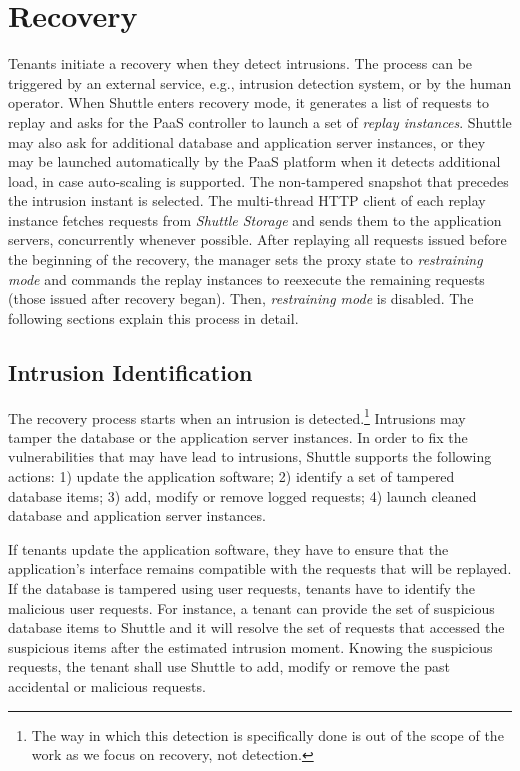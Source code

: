 \section{Recovery}
\label{sec:recovery}

Tenants initiate a recovery when they detect intrusions. The process can be triggered by an external service, e.g., intrusion detection system, or by the human operator. When Shuttle enters recovery mode, it generates a list of requests to replay and asks for the \ac{PaaS} controller to launch a set of \textit{replay instances}. Shuttle may also ask for additional database and application server instances, or they may be launched automatically by the \ac{PaaS} platform when it detects additional load, in case auto-scaling is supported. The non-tampered snapshot that precedes the intrusion instant is selected. The multi-thread HTTP client of each replay instance fetches requests from \emph{Shuttle Storage} and sends them to the application servers, concurrently whenever possible. After replaying all requests issued before the beginning of the recovery, the manager sets the proxy state to \emph{restraining mode} and commands the replay instances to reexecute the remaining requests (those issued after recovery began). Then, \emph{restraining mode} is disabled. 
The following sections explain this process in detail.


\subsection{Intrusion Identification}
\label{sec:recovery:detection}

The recovery process starts when an intrusion is detected.\footnote{The way in which this detection is specifically done is out of the scope of the work  as we focus on recovery, not detection.} Intrusions may tamper the database or the application server instances. In order to fix the vulnerabilities that may have lead to intrusions, Shuttle supports the following actions: 1) update the application software; 2) identify a set of tampered database items; 3) add, modify or remove logged requests; 4) launch cleaned database and application server instances.

If tenants update the application software, they have to ensure that the application's interface remains compatible with the requests that will be replayed. If the database is tampered using user requests,  tenants have to identify the malicious user requests. For instance, a tenant can provide the set of suspicious database items to Shuttle and it will resolve the set of requests that accessed the suspicious items after the estimated intrusion moment. Knowing the suspicious requests, the tenant shall use Shuttle to add, modify or remove the past accidental or malicious requests. 


